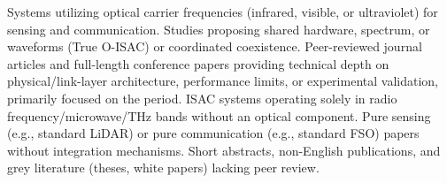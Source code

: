 {}\markdownRendererInterblockSeparator
{}\markdownRendererUlBeginTight
\markdownRendererUlItem {} Systems utilizing optical carrier frequencies (infrared, visible, or ultraviolet) for  sensing and communication.\markdownRendererUlItemEnd 
\markdownRendererUlItem {} Studies proposing shared hardware, spectrum, or waveforms (True O-ISAC) or coordinated coexistence.\markdownRendererUlItemEnd 
\markdownRendererUlItem {} Peer-reviewed journal articles and full-length conference papers providing technical depth on physical/link-layer architecture, performance limits, or experimental validation, primarily focused on the  period.\markdownRendererUlItemEnd 
\markdownRendererUlEndTight \markdownRendererInterblockSeparator
{}\markdownRendererInterblockSeparator
{}\markdownRendererUlBeginTight
\markdownRendererUlItem {} ISAC systems operating solely in radio frequency/microwave/THz bands without an optical component.\markdownRendererUlItemEnd 
\markdownRendererUlItem {} Pure sensing (e.g., standard LiDAR) or pure communication (e.g., standard FSO) papers without integration mechanisms.\markdownRendererUlItemEnd 
\markdownRendererUlItem {} Short abstracts, non-English publications, and grey literature (theses, white papers) lacking peer review.\markdownRendererUlItemEnd 
\markdownRendererUlEndTight \markdownRendererInterblockSeparator
{}\markdownRendererInterblockSeparator
